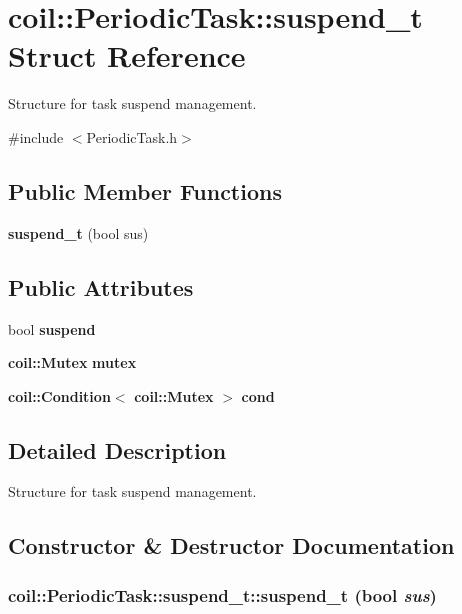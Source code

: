 \section{coil::PeriodicTask::suspend\_\-t Struct Reference}
\label{structcoil_1_1PeriodicTask_1_1suspend__t}


Structure for task suspend management.  




{\ttfamily \#include $<$PeriodicTask.h$>$}

\subsection*{Public Member Functions}
\begin{DoxyCompactItemize}
\item 
{\bf suspend\_\-t} (bool sus)
\end{DoxyCompactItemize}
\subsection*{Public Attributes}
\begin{DoxyCompactItemize}
\item 
bool {\bf suspend}
\item 
{\bf coil::Mutex} {\bf mutex}
\item 
{\bf coil::Condition}$<$ {\bf coil::Mutex} $>$ {\bf cond}
\end{DoxyCompactItemize}


\subsection{Detailed Description}
Structure for task suspend management. 

\subsection{Constructor \& Destructor Documentation}
\subsubsection[{suspend\_\-t}]{\setlength{\rightskip}{0pt plus 5cm}coil::PeriodicTask::suspend\_\-t::suspend\_\-t (bool {\em sus})\hspace{0.3cm}{\ttfamily  [inline]}}\label{structcoil_1_1PeriodicTask_1_1suspend__t_ab91a7db9773fff75f5b34de7d2c0580f}


